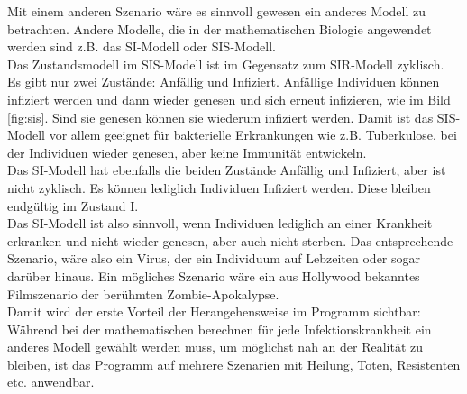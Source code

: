 Mit einem anderen Szenario wäre es sinnvoll gewesen ein anderes Modell zu betrachten. 
Andere Modelle, die in der mathematischen Biologie angewendet werden sind z.B. das SI-Modell oder SIS-Modell.\\
Das Zustandsmodell im SIS-Modell ist im Gegensatz zum SIR-Modell zyklisch. Es gibt nur zwei Zustände: Anfällig und Infiziert. Anfällige Individuen können infiziert werden und dann wieder genesen und sich erneut infizieren, wie im Bild \ref{fig:sis}. Sind sie genesen können sie wiederum infiziert werden. Damit ist das SIS-Modell vor allem geeignet für bakterielle Erkrankungen wie z.B. Tuberkulose, bei der Individuen wieder genesen, aber keine Immunität entwickeln. \\
Das SI-Modell hat ebenfalls die beiden Zustände Anfällig und Infiziert, aber ist nicht zyklisch. Es können lediglich Individuen Infiziert werden. Diese bleiben endgültig im Zustand I.\\ 
Das SI-Modell ist also sinnvoll, wenn Individuen lediglich an einer Krankheit erkranken und nicht wieder genesen, aber auch nicht sterben. Das entsprechende Szenario, wäre also ein Virus, der ein Individuum auf Lebzeiten oder sogar darüber hinaus. Ein mögliches Szenario wäre ein aus Hollywood bekanntes Filmszenario der berühmten Zombie-Apokalypse.\\
Damit wird der erste Vorteil der Herangehensweise im Programm sichtbar: Während bei der mathematischen berechnen für jede Infektionskrankheit ein anderes Modell gewählt werden muss, um möglichst nah an der Realität zu bleiben, ist das Programm auf mehrere Szenarien mit Heilung, Toten, Resistenten etc. anwendbar.